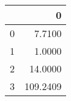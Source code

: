 \begin{tabular}{lr}
\toprule
{} &         0 \\
\midrule
0 &    7.7100 \\
1 &    1.0000 \\
2 &   14.0000 \\
3 &  109.2409 \\
\bottomrule
\end{tabular}
